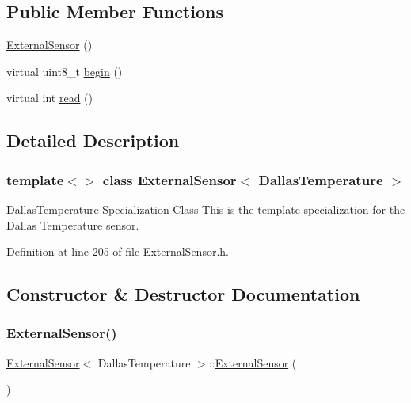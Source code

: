 \subsection*{Public Member Functions}
\begin{DoxyCompactItemize}
\item 
\hyperlink{class_external_sensor_3_01_dallas_temperature_01_4_ad290681e8780cdf1870416eee99d699d}{External\+Sensor} ()
\item 
virtual uint8\+\_\+t \hyperlink{class_external_sensor_3_01_dallas_temperature_01_4_ac5275129b05e2ff8df45d5b222a661d9}{begin} ()
\item 
virtual int \hyperlink{class_external_sensor_3_01_dallas_temperature_01_4_a127ead06440ec972c22db2abeb8e2b51}{read} ()
\end{DoxyCompactItemize}


\subsection{Detailed Description}
\subsubsection*{template$<$$>$\newline
class External\+Sensor$<$ Dallas\+Temperature $>$}

Dallas\+Temperature Specialization Class This is the template specialization for the Dallas Temperature sensor. 

Definition at line 205 of file External\+Sensor.\+h.



\subsection{Constructor \& Destructor Documentation}
\mbox{\label{class_external_sensor_3_01_dallas_temperature_01_4_ad290681e8780cdf1870416eee99d699d}} 
\subsubsection{\texorpdfstring{External\+Sensor()}{ExternalSensor()}}
{\footnotesize\ttfamily \hyperlink{class_external_sensor}{External\+Sensor}$<$ Dallas\+Temperature $>$\+::\hyperlink{class_external_sensor}{External\+Sensor} (\begin{DoxyParamCaption}{ }\end{DoxyParamCaption})\hspace{0.3cm}{\ttfamily [inline]}}

